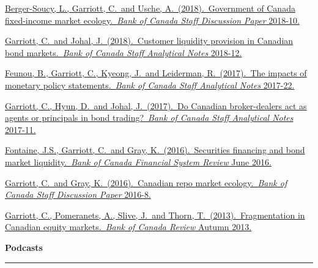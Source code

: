 \documentclass[11pt,letterpaper]{article}
\begin{document}
\bigskip
\noindent \href{https://www.bankofcanada.ca/2018/09/staff-discussion-paper-2018-10/}{Berger-Soucy, L., Garriott, C.~and Usche, A.~(2018).~Government of Canada fixed-income market ecology.~\textit{Bank of Canada Staff Discussion Paper} 2018-10.}

\bigskip
\noindent \href{https://www.bankofcanada.ca/2018/05/staff-analytical-note-2018-12/}{Garriott, C.~and Johal, J.~(2018).~Customer liquidity provision in Canadian bond markets.~\textit{Bank of Canada Staff Analytical Notes} 2018-12.}

\bigskip
\noindent \href{https://www.bankofcanada.ca/2017/11/staff-analytical-note-2017-22/}{Feunou, B., Garriott, C., Kyeong, J.~and Leiderman, R.~(2017).~The impacts of monetary policy statements.~\textit{Bank of Canada Staff Analytical Notes} 2017-22.}

\bigskip
\noindent \href{https://www.bankofcanada.ca/2017/09/staff-analytical-note-2017-11/}{Garriott, C., Hyun, D.~and Johal, J.~(2017).~Do Canadian broker-dealers act as agents or principals in bond trading?~\textit{Bank of Canada Staff Analytical Notes} 2017-11.}

\bigskip
\noindent \href{https://www.bankofcanada.ca/wp-content/uploads/2016/06/fsr-june2016-fontaine.pdf}{Fontaine, J.S., Garriott, C.~and Gray, K.~(2016).~Securities financing and bond market liquidity.~\textit{Bank of Canada Financial System Review} June 2016.}

\bigskip
\noindent \href{https://www.bankofcanada.ca/2016/03/staff-discussion-paper-2016-8/}{Garriott, C.~and Gray, K.~(2016).~Canadian repo market ecology.~\textit{Bank of Canada Staff Discussion Paper} 2016-8.}

\bigskip
\noindent \href{https://www.bankofcanada.ca/wp-content/uploads/2013/11/boc-review-autumn13-garriott.pdf}{Garriott, C., Pomeranets, A., Slive, J.~and Thorn, T.~(2013).~Fragmentation in Canadian equity markets.~\textit{Bank of Canada Review} Autumn 2013.}

\bigskip
\noindent \textbf{Podcasts}
\smallskip
\hrule
\end{document}
